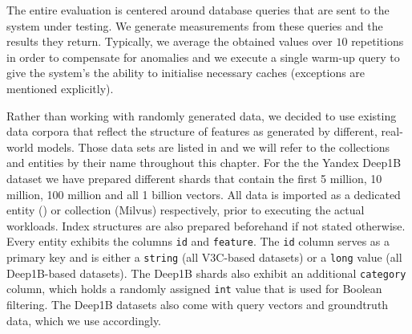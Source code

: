 The entire evaluation is centered around database queries that are sent to the system under testing. We generate measurements from these queries and the results they return. Typically, we average the obtained values over $10$ repetitions in order to compensate for anomalies and we execute a single warm-up query to give the system's the ability to initialise necessary caches (exceptions are mentioned explicitly). 

Rather than working with randomly generated data, we decided to use existing data corpora that reflect the structure of features as generated by different, real-world models. Those data sets are listed in  and we will refer to the collections and entities by their name throughout this chapter. For the the Yandex Deep1B \cite{Babenko:2016Efficient} dataset we have prepared different shards that contain the first 5 million, 10 million, 100 million and all 1 billion vectors. All data is imported as a dedicated entity (\cottontail{}) or collection (Milvus) respectively, prior to executing the actual workloads. Index structures are also prepared beforehand if not stated otherwise. Every entity exhibits the columns \texttt{id} and \texttt{feature}. The \texttt{id} column serves as a primary key and is either a \texttt{string} (all V3C-based datasets) or a \texttt{long} value (all Deep1B-based datasets). The Deep1B shards also exhibit an additional \texttt{category} column, which holds a randomly assigned \texttt{int} value that is used for Boolean filtering. The Deep1B datasets also come with query vectors and groundtruth data, which we use accordingly.

